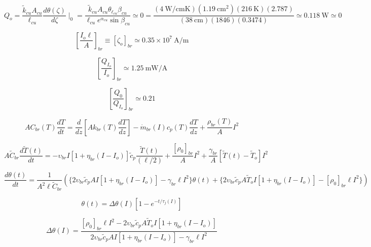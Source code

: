 \begin{equation}%
Q_o=\frac{\tilde{k}_{cu}A_{cu}}{\ell_{cu}}\frac{d\theta(\zeta)}{d\zeta}\mid_0=\frac{\tilde{k}_{cu}A_{cu}\theta_{\ell_{cu}}\beta_{cu}}{\ell_{cu}e^{\alpha_{cu}}\sin\beta_{cu}}\simeq 0 
=\frac{(4\ \mathrm{W/cmK})(1.19\ \mathrm{cm^2})(216\ \mathrm{K})(2.787)}{(38\ \mathrm{cm})(1846)(0.3474)}\simeq0.118\ \mathrm{W}\simeq 0
\end{equation}

\begin{equation}%
\left[\frac{I_o\ell}{A}\right]_{br}\equiv[\zeta_o]_{br}\simeq0.35\times 10^7\ \mathrm{A/m}
\end{equation}

\begin{equation}%
\left[\frac{Q_{I_o}}{I_o}\right]_{br}\simeq 1.25\ \mathrm{mW/A}
\end{equation}

\begin{equation}%
\left[\frac{Q_0}{Q_{I_o}}\right]_{br}\simeq 0.21
\end{equation}

\begin{equation}%
AC_{br}(T)\frac{dT}{dt}=\frac{d}{dz}\left[Ak_{br}(T)\frac{dT}{dz}\right]-\dot{m}_{br}(I)c_p(T)\frac{dT}{dz}+\frac{\rho_{br}(T)}{A}I^2
\end{equation}

\begin{equation}%
A\tilde{C}_{br}\frac{d\tilde{T}(t)}{dt}=-\upsilon_{br}I[1+\eta_{br}(I-I_o)]\tilde{c}_p\frac{\tilde{T}(t)}{(\ell/2)}+\frac{[\rho_0]_{br}}{A}I^2+\frac{\gamma_{br}}{A}[\tilde{T}(t)-\tilde{T}_o]I^2
\end{equation}

\begin{equation}%
\frac{d\theta(t)}{dt}=\frac{1}{A^2\ell\tilde{C}_{br}}\left(\{2\upsilon_{br}\tilde{c}_pAI[1+\eta_{br}(I-I_o)]-\gamma_{br}\ell I^2\}\theta(t) 
+\{2\upsilon_{br}\tilde{c}_pA\tilde{T}_oI[1+\eta_{br}(I-I_o)]-[\rho_0]_{br}\ell I^2\}\right)
\end{equation}

\begin{equation}%
\theta(t)=\Delta\theta(I)\left[1-e^{-t/\tau_j(I)}\right]
\end{equation}

\begin{equation}%
\Delta\theta(I)=\frac{[\rho_0]_{br}\ell I^2-2\upsilon_{br}\tilde{c}_pA\tilde{T}_oI[1+\eta_{br}(I-I_o)]}{2\upsilon_{br}\tilde{c}_pAI[1+\eta_{br}(I-I_o)]-\gamma_{br}\ell I^2}
\end{equation}

